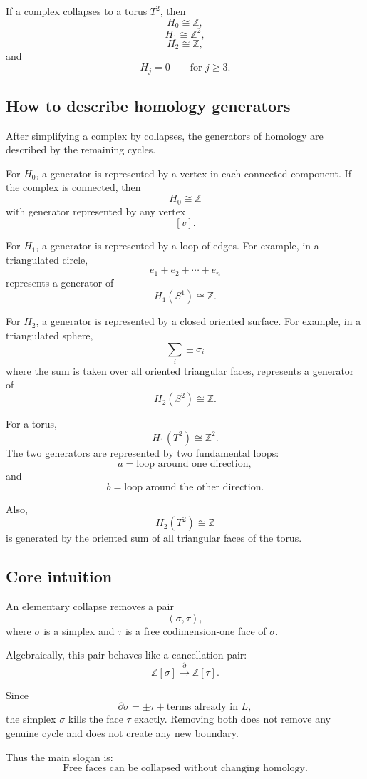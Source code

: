\documentclass[12pt,a4paper]{article}
\theoremstyle{notespace}
\begin{document}
If a complex collapses to a torus \(T^2\), then
\[
H_0\cong \mathbb Z,
\]
\[
H_1\cong \mathbb Z^2,
\]
\[
H_2\cong \mathbb Z,
\]
and
\[
H_j=0
\qquad
\text{for } j\geq 3.
\]

\subsection{How to describe homology generators}

After simplifying a complex by collapses, the generators of homology are described by the remaining cycles.

For \(H_0\), a generator is represented by a vertex in each connected component. If the complex is connected, then
\[
H_0\cong \mathbb Z
\]
with generator represented by any vertex
\[
[v].
\]

For \(H_1\), a generator is represented by a loop of edges. For example, in a triangulated circle,
\[
e_1+e_2+\cdots+e_n
\]
represents a generator of
\[
H_1(S^1)\cong \mathbb Z.
\]

For \(H_2\), a generator is represented by a closed oriented surface. For example, in a triangulated sphere,
\[
\sum_i \pm \sigma_i
\]
where the sum is taken over all oriented triangular faces, represents a generator of
\[
H_2(S^2)\cong \mathbb Z.
\]

For a torus,
\[
H_1(T^2)\cong \mathbb Z^2.
\]
The two generators are represented by two fundamental loops:
\[
a=\text{loop around one direction},
\]
and
\[
b=\text{loop around the other direction}.
\]

Also,
\[
H_2(T^2)\cong \mathbb Z
\]
is generated by the oriented sum of all triangular faces of the torus.

\subsection{Core intuition}

An elementary collapse removes a pair
\[
(\sigma,\tau),
\]
where \(\sigma\) is a simplex and \(\tau\) is a free codimension-one face of \(\sigma\).

Algebraically, this pair behaves like a cancellation pair:
\[
\mathbb Z[\sigma]
\xrightarrow{\partial}
\mathbb Z[\tau].
\]

Since
\[
\partial\sigma=\pm\tau+\text{terms already in }L,
\]
the simplex \(\sigma\) kills the face \(\tau\) exactly. Removing both does not remove any genuine cycle and does not create any new boundary.

Thus the main slogan is:
\[
\boxed{
	\text{Free faces can be collapsed without changing homology.}
}
\]
\end{document}
